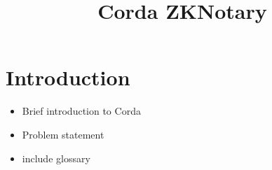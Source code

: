 \documentclass[a4paper,12pt,english]{memoir}
\title{Corda ZKNotary}
\begin{document}
\maketitle


\begin{abstract}

\end{abstract}

\chapter*{Introduction}

\begin{itemize}
\item Brief introduction to Corda
\item Problem statement
\end{itemize}







\begin{itemize}
\item include glossary 
\end{itemize}

\appendix


\end{document}
